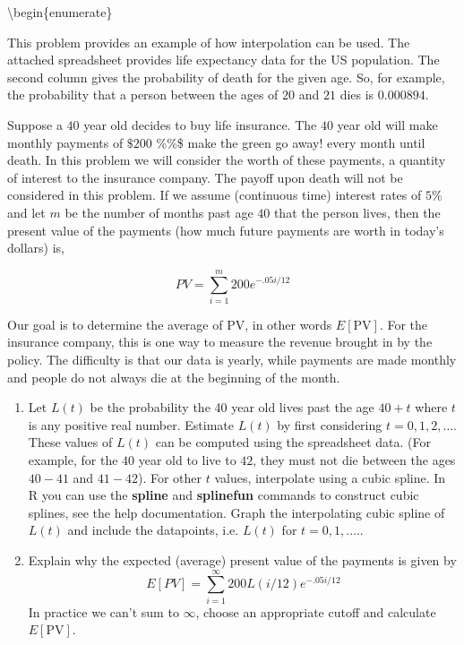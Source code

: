 \documentclass[]{article}
\title{}
\author{}
\date{}
\begin{document}
\textbackslash{}begin\{enumerate\}

\item 

This problem provides an example of how interpolation can be used. The
attached spreadsheet provides life expectancy data for the US
population. The second column gives the probability of death for the
given age. So, for example, the probability that a person between the
ages of \(20\) and \(21\) dies is \(0.000894\).

Suppose a \(40\) year old decides to buy life insurance. The \(40\) year
old will make monthly payments of \(\$200\) \%\%\$ make the green go
away! every month until death. In this problem we will consider the
worth of these payments, a quantity of interest to the insurance
company. The payoff upon death will not be considered in this problem.
If we assume (continuous time) interest rates of \(5\%\) and let \(m\)
be the number of months past age \(40\) that the person lives, then the
present value of the payments (how much future payments are worth in
today's dollars) is,

\begin{equation}  \label{PV}
PV = \sum_{i=1}^m 200 e^{-.05 i/12}
\end{equation}

Our goal is to determine the average of PV, in other words
\(E[\text{PV}]\). For the insurance company, this is one way to measure
the revenue brought in by the policy. The difficulty is that our data is
yearly, while payments are made monthly and people do not always die at
the beginning of the month.

\begin{enumerate}
\item Let $L(t)$ be the probability the 40 year old lives past the age $40+t$ where $t$ is any positive real number.  Estimate $L(t)$ by first considering $t=0,1,2,\dots$.   These values of $L(t)$ can be computed using the spreadsheet data.  (For example, for the $40$ year old to live to $42$, they must not die between the ages $40-41$ and $41-42$).  For other $t$ values, interpolate using a cubic spline.  In R you can use the \textbf{spline} and \textbf{splinefun} commands to construct cubic splines, see the help documentation.   Graph the interpolating cubic spline of $L(t)$ and include the datapoints, i.e. $L(t)$ for $t=0,1,\dots$.. 
\newcommand{\DL}{\text{DL}}
\item Explain why the expected (average) present value of the payments is given by
\begin{equation}  
E[PV] = \sum_{i=1}^\infty 200 L(i/12) e^{-.05 i/12}
\end{equation}
In practice we can't sum to $\infty$, choose an appropriate cutoff and calculate $E[\text{PV}]$. 
\end{enumerate}
\end{document}

